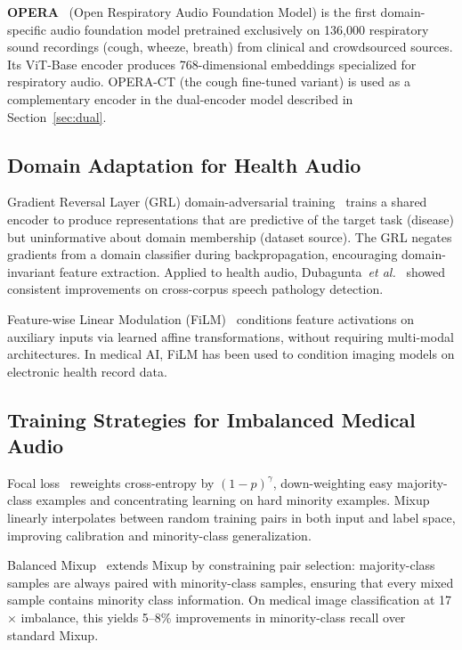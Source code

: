 \documentclass[10pt,journal,compsoc]{IEEEtran}
\begin{document}
\textbf{OPERA}~\cite{opera} (Open Respiratory Audio Foundation Model) is
the first domain-specific audio foundation model pretrained exclusively on
136{,}000 respiratory sound recordings (cough, wheeze, breath) from clinical
and crowdsourced sources. Its ViT-Base encoder produces 768-dimensional
embeddings specialized for respiratory audio. OPERA-CT (the cough fine-tuned variant) is used as a complementary encoder
in the dual-encoder model described in Section~\ref{sec:dual}.

\subsection{Domain Adaptation for Health Audio}

Gradient Reversal Layer (GRL) domain-adversarial training~\cite{dann}
trains a shared encoder to produce representations that are predictive
of the target task (disease) but uninformative about domain membership
(dataset source). The GRL negates gradients from a domain classifier during
backpropagation, encouraging domain-invariant feature extraction.
Applied to health audio, Dubagunta~\textit{et al.}~\cite{dubagunta}
showed consistent improvements on cross-corpus speech pathology detection.

Feature-wise Linear Modulation (FiLM)~\cite{film} conditions feature
activations on auxiliary inputs via learned affine transformations, without
requiring multi-modal architectures. In medical AI, FiLM has been used to
condition imaging models on electronic health record data.

\subsection{Training Strategies for Imbalanced Medical Audio}

Focal loss~\cite{focal} reweights cross-entropy by $(1 - p)^\gamma$,
down-weighting easy majority-class examples and concentrating learning
on hard minority examples. Mixup~\cite{mixup} linearly interpolates between
random training pairs in both input and label space, improving calibration
and minority-class generalization.

Balanced Mixup~\cite{balanced_mixup} extends Mixup by constraining pair
selection: majority-class samples are always paired with minority-class
samples, ensuring that every mixed sample contains minority class information.
On medical image classification at 17$\times$ imbalance, this yields
5--8\% improvements in minority-class recall over standard Mixup.
\end{document}
